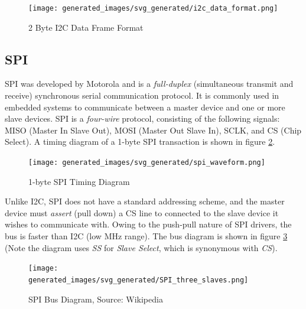 \documentclass[main.tex]{subfiles}
\begin{document}
\begin{figure}[H]
    \centering
    \texttt{[image: generated\_images/svg\_generated/i2c\_data\_format.png]}
    \caption{2 Byte I2C Data Frame Format}
    \label{fig:i2c_data_format}
\end{figure}

\subsection{SPI}
SPI was developed by Motorola \cite{SPI_history} and is a \textit{full-duplex} (simultaneous transmit and receive) synchronous serial communication protocol. It is commonly used in embedded systems to communicate between a master device and one or more slave devices. SPI is a \textit{four-wire} protocol, consisting of the following signals: MISO (Master In Slave Out), MOSI (Master Out Slave In), SCLK, and CS (Chip Select). A timing diagram of a 1-byte SPI transaction is shown in figure \ref{fig:spi_timing}.

\begin{figure}[H]
    \centering
    \texttt{[image: generated\_images/svg\_generated/spi\_waveform.png]}
    \caption{1-byte SPI Timing Diagram}
    \label{fig:spi_timing}
\end{figure}

\noindent Unlike I2C, SPI does not have a standard addressing scheme, and the master device must \textit{assert} (pull down) a CS line to connected to the slave device it wishes to communicate with. Owing to the push-pull nature of SPI drivers, the bus is faster than I2C (low MHz range). The bus diagram is shown in figure \ref{fig:spi_bus} (Note the diagram uses \textit{SS} for \textit{Slave Select}, which is synonymous with \textit{CS}).

\begin{figure}[H]
    \centering
    \texttt{[image: generated\_images/svg\_generated/SPI\_three\_slaves.png]}
    \caption{SPI Bus Diagram, Source: Wikipedia \cite{wikipedia_SPI_bus}}
    \label{fig:spi_bus}
\end{figure}
\end{document}
